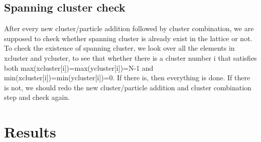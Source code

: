 \documentclass[11pt, oneside]{article}   	%
\begin{document}
\subsection{Spanning cluster check}
After every new cluster/particle addition followed by cluster combination, we are supposed to check whether spanning cluster is already exist in the lattice or not. To check the existence of spanning cluster, we look over all the elements in xcluster and ycluster, to see that whether there is a cluster number i that satisfies both max(xcluster[i])=max(ycluster[i])=N-1 and min(xcluster[i])=min(ycluster[i])=0. If there is, then everything is done. If there is not, we should redo the new cluster/particle addition and cluster combination step and check again.


\section{Results}
\end{document}
